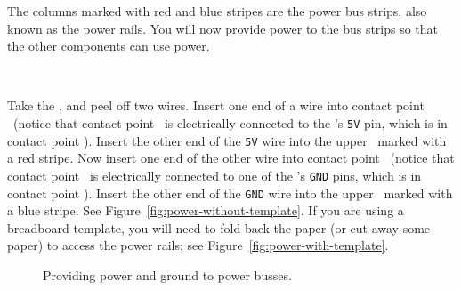 The columns marked with red and blue stripes are the power bus strips, also known as the power rails.
You will now provide power to the bus strips so that the other components can use power.

\disconnect\

Take the \rainbow, and peel off two wires.
Insert one end of a wire into contact point \mcufivevoltcontactpoint\ (notice that contact point \mcufivevoltcontactpoint\ is electrically connected to the \developmentboard's \texttt{5V} pin, which is in contact point \mcufivevolt).
Insert the other end of the \texttt{5V} wire into the upper \power\ marked with a red stripe.
Now insert one end of the other wire into contact point \mcuuppergroundcontactpoint\ (notice that contact point \mcuuppergroundcontactpoint\ is electrically connected to one of the \developmentboard's \texttt{GND} pins, which is in contact point \mcuuppergroundcontactpoint).
Insert the other end of the \texttt{GND} wire into the upper \ground\ marked with a blue stripe.
See Figure~\ref{fig:power-without-template}.
If you are using a breadboard template, you will need to fold back the paper (or cut away some paper) to access the power rails;
see Figure~\ref{fig:power-with-template}.

\begin{figure}
    \centering
    \hfil
    \caption{Providing power and ground to power busses.}
\end{figure}

